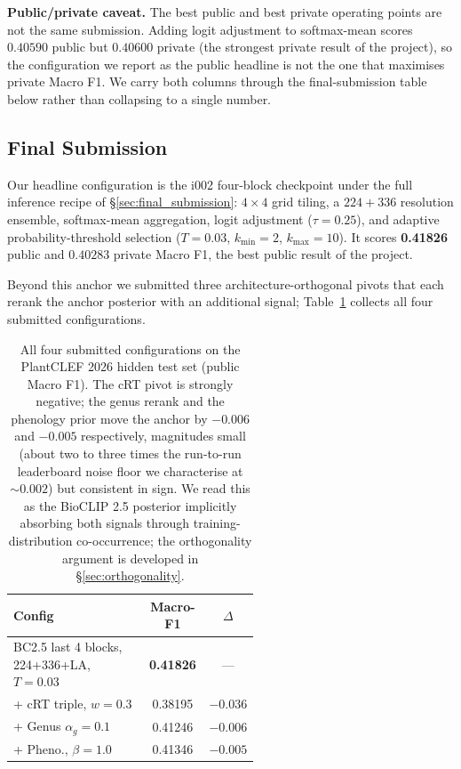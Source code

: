\textbf{Public/private caveat.} The best public and best private operating points are not the
same submission. Adding logit adjustment to softmax-mean scores $0.40590$ public but $0.40600$
private (the strongest private result of the project), so the configuration we report as the
public headline is not the one that maximises private Macro F1. We carry both columns through the
final-submission table below rather than collapsing to a single number.

\subsection{Final Submission}
\label{sec:final_results}

Our headline configuration is the i002 four-block checkpoint under the full inference
recipe of \S\ref{sec:final_submission}: $4{\times}4$ grid tiling, a $224{+}336$
resolution ensemble, softmax-mean aggregation, logit adjustment ($\tau{=}0.25$), and adaptive
probability-threshold selection ($T{=}0.03$, $k_{\min}{=}2$, $k_{\max}{=}10$). It scores
\textbf{0.41826} public and $0.40283$ private Macro F1, the best public result of the project.

Beyond this anchor we submitted three architecture-orthogonal pivots that each rerank the anchor
posterior with an additional signal; Table~\ref{tab:summary} collects all four submitted
configurations.

\begin{table}[ht]
  \centering
  \scriptsize
  \setlength{\tabcolsep}{2pt}
  \begin{tabular}{@{}p{0.55\linewidth}cc@{}}
    \toprule
    Config & Macro-F1 & $\Delta$ \\
    \midrule
    BC2.5 last 4 blocks, 224+336+LA, $T{=}0.03$ & \textbf{0.41826} & --- \\
    \hspace{1em}+ cRT triple, $w{=}0.3$ & 0.38195 & $-0.036$ \\
    \hspace{1em}+ Genus $\alpha_g{=}0.1$ & 0.41246 & $-0.006$ \\
    \hspace{1em}+ Pheno., $\beta{=}1.0$ & 0.41346 & $-0.005$ \\
    \bottomrule
  \end{tabular}
  \caption{All four submitted configurations on the PlantCLEF 2026 hidden test set (public Macro F1). The cRT pivot is strongly negative; the genus rerank and the phenology prior move the anchor by $-0.006$ and $-0.005$ respectively, magnitudes small (about two to three times the run-to-run leaderboard noise floor we characterise at ${\sim}0.002$) but consistent in sign. We read this as the BioCLIP 2.5 posterior implicitly absorbing both signals through training-distribution co-occurrence; the orthogonality argument is developed in \S\ref{sec:orthogonality}.}
  \label{tab:summary}
\end{table}

